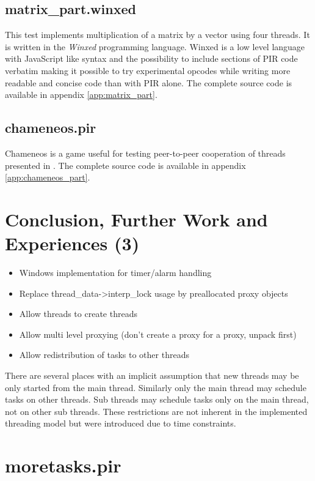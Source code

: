 \documentclass[bachelor,english]{hgbthesis}
\begin{document}
\section{matrix\_part.winxed}

This test implements multiplication of a matrix by a vector using four threads. It is written in the \textit{Winxed} programming language. Winxed is a low level language with JavaScript like syntax and the possibility to include sections of PIR code verbatim making it possible to try experimental opcodes while writing more readable and concise code than with PIR alone. The complete source code is available in appendix \ref{app:matrix_part}.

\section{chameneos.pir}

Chameneos is a game useful for testing peer-to-peer cooperation of threads presented in \cite{Chameneos}. The complete source code is available in appendix \ref{app:chameneos_part}.

\chapter{Conclusion, Further Work and Experiences (3)}

\begin{itemize}
\item Windows implementation for timer/alarm handling
\item Replace thread\_data->interp\_lock usage by preallocated proxy objects
\item Allow threads to create threads
\item Allow multi level proxying (don't create a proxy for a proxy, unpack first)
\item Allow redistribution of tasks to other threads
\end{itemize}

There are several places with an implicit assumption that new threads may be only started from the main thread. Similarly only the main thread may schedule tasks on other threads. Sub threads may schedule tasks only on the main thread, not on other sub threads. These restrictions are not inherent in the implemented threading model but were introduced due to time constraints.

\appendix
\chapter{moretasks.pir}
\label{app:moretasks}
\end{document}
